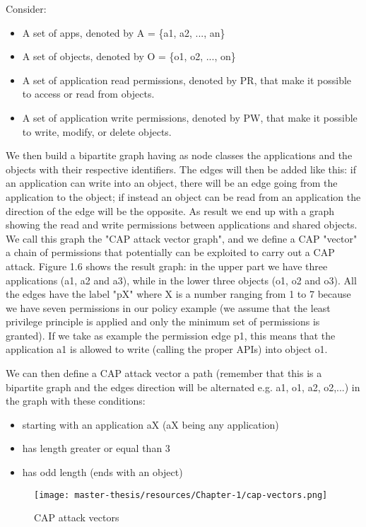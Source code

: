 \documentclass[a4paper,10pt]{memoir}
\begin{document}
Consider:
\begin{itemize}
  \item A set of apps, denoted by A = \{a1, a2, ..., an\}
  \item A set of objects, denoted by O = \{o1, o2, ..., on\}
  \item A set of application read permissions, denoted by PR, that make it possible to access or read from objects.
  \item A set of application write permissions, denoted by PW, that make it possible to write, modify, or delete objects.
\end{itemize}

We then build a bipartite graph having as node classes the applications and the objects with their respective identifiers. The edges will then be added like this: if an application can write into an object, there will be an edge going from the application to the object; if instead an object can be read from an application the direction of the edge will be the opposite. As result we end up with a graph showing the read and write permissions between applications and shared objects. We call this graph the "CAP attack vector graph", and we define a CAP "vector" a chain of permissions that potentially can be exploited to carry out a CAP attack. Figure 1.6 shows the result graph: in the upper part we have three applications (a1, a2 and a3), while in the lower three objects (o1, o2 and o3). All the edges have the label "pX" where X is a number ranging from 1 to 7 because we have seven permissions in our policy example (we assume that the least privilege principle is applied and only the minimum set of permissions is granted). If we take as example the permission edge p1, this means that the application a1 is allowed to write (calling the proper APIs) into object o1. 

We can then define a CAP attack vector a path (remember that this is a bipartite graph and the edges direction will be alternated e.g. a1, o1, a2, o2,...) in the graph with these conditions:
\begin{itemize}
  \item starting with an application aX (aX being any application)
  \item has length greater or equal than 3
  \item has odd length (ends with an object)
\end{itemize}

\begin{figure}[h]
\caption{CAP attack vectors}
\label{fig:cap-vectors}
\texttt{[image: master-thesis/resources/Chapter-1/cap-vectors.png]}
\centering
\end{figure}
\end{document}
